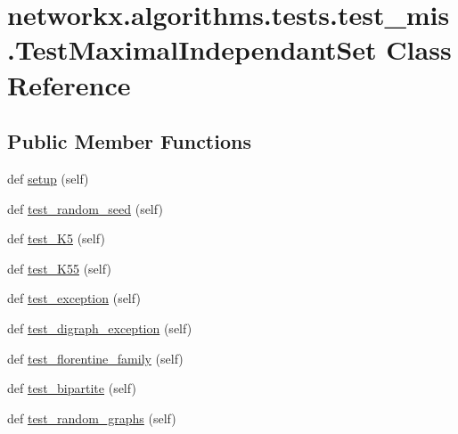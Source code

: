 \hypertarget{classnetworkx_1_1algorithms_1_1tests_1_1test__mis_1_1TestMaximalIndependantSet}{}\section{networkx.\+algorithms.\+tests.\+test\+\_\+mis.\+Test\+Maximal\+Independant\+Set Class Reference}
\label{classnetworkx_1_1algorithms_1_1tests_1_1test__mis_1_1TestMaximalIndependantSet}
\subsection*{Public Member Functions}
\begin{DoxyCompactItemize}
\item 
def \hyperlink{classnetworkx_1_1algorithms_1_1tests_1_1test__mis_1_1TestMaximalIndependantSet_acdf79125d00f1a480a1f5f4020588d20}{setup} (self)
\item 
def \hyperlink{classnetworkx_1_1algorithms_1_1tests_1_1test__mis_1_1TestMaximalIndependantSet_ae26129020452c153d4040199b9784feb}{test\+\_\+random\+\_\+seed} (self)
\item 
def \hyperlink{classnetworkx_1_1algorithms_1_1tests_1_1test__mis_1_1TestMaximalIndependantSet_a5fcc5b1eec5125c7412bfe56f0504be2}{test\+\_\+\+K5} (self)
\item 
def \hyperlink{classnetworkx_1_1algorithms_1_1tests_1_1test__mis_1_1TestMaximalIndependantSet_a8c889099f174497663fc9ebf1b4b9054}{test\+\_\+\+K55} (self)
\item 
def \hyperlink{classnetworkx_1_1algorithms_1_1tests_1_1test__mis_1_1TestMaximalIndependantSet_ad282f15696eda3167bfcd20a48276517}{test\+\_\+exception} (self)
\item 
def \hyperlink{classnetworkx_1_1algorithms_1_1tests_1_1test__mis_1_1TestMaximalIndependantSet_abe4c04749d171db49c4a3fc0081d98f0}{test\+\_\+digraph\+\_\+exception} (self)
\item 
def \hyperlink{classnetworkx_1_1algorithms_1_1tests_1_1test__mis_1_1TestMaximalIndependantSet_a98379f89288bb125ba133b535c6b0cd6}{test\+\_\+florentine\+\_\+family} (self)
\item 
def \hyperlink{classnetworkx_1_1algorithms_1_1tests_1_1test__mis_1_1TestMaximalIndependantSet_ae16ae4d809ab9ae92b8dd7c0a4572a3f}{test\+\_\+bipartite} (self)
\item 
def \hyperlink{classnetworkx_1_1algorithms_1_1tests_1_1test__mis_1_1TestMaximalIndependantSet_a732da259dbca0b0f247659394129b0ef}{test\+\_\+random\+\_\+graphs} (self)
\end{DoxyCompactItemize}
